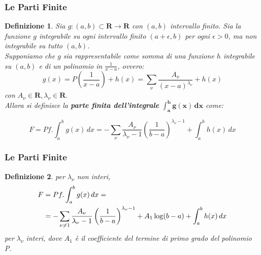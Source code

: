 \documentclass[11pt]{beamer}
\newtheorem{definizione}{Definizione}[section]
\begin{document}
\begin{frame}
\frametitle{Le Parti Finite}
\begin{definizione}

Sia $g:(a,b)\subset\mathbf{R}\rightarrow\mathbf{R}$ con $(a,b)$ intervallo finito.
Sia la funzione $g$ integrabile su ogni intervallo finito $(a+\epsilon,b)$ per ogni $\epsilon>0$, ma non integrabile su tutto $(a,b)$.\\
Supponiamo che $g$ sia rappresentabile come somma di una funzione $h$ integrabile su $(a,b)$ e di un polinomio in $\frac{1}{x-a}$, ovvero:
\begin{equation}
g(x)=P\left( \frac{1}{x-a} \right) + h(x) = \sum_\nu \frac{A_\nu}{(x-a)^{\lambda_\nu}} + h(x)
\end{equation}
con $A_\nu \in \mathbf{R}, \lambda_\nu \in \mathbf{R}.$\\
\noindent Allora si definisce la \textbf{parte finita dell'integrale} $\mathbf{\int_a^b g(x)\,dx}$ come:

\begin{displaymath}
F = Pf.\int_a^b g(x) \,dx= -\sum_\nu \frac{A_\nu}{\lambda_\nu -1}\left( \frac{1}{b-a}\right) ^{\lambda_\nu -1} +\int_a^b h(x) \,dx
\end{displaymath}

\end{definizione}
\end{frame}

\begin{frame}
\frametitle{Le Parti Finite}
\begin{definizione}
per $\lambda_\nu$ non interi,
\begin{align}
F &= Pf.\int_a^b g(x) \,dx = \notag \\
& =-\sum_{\nu\ne 1} \frac{A_\nu}{\lambda_\nu -1}\left( \frac{1}{b-a}\right) ^{\lambda_\nu -1}+A_1\log (b-a) +\int_a^b h(x) \,dx
\notag
\end{align}
per $\lambda_\nu$ interi, dove $A_1$ è il coefficiente del termine di primo grado del polinomio P.


\end{definizione}

\end{frame}


\end{document}

